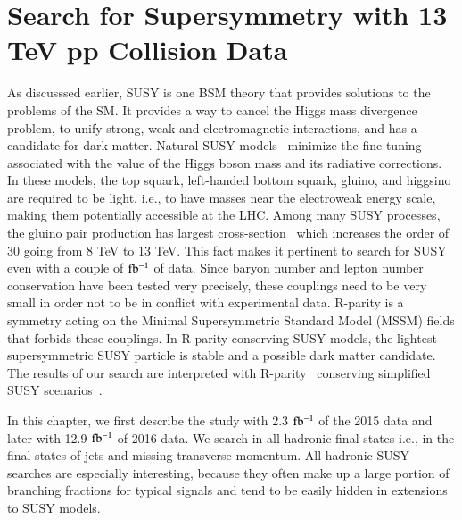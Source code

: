 




\chapter{Search for Supersymmetry with 13 TeV pp Collision Data  \label{Search for Supersymmetry with 13 TeV pp Collision Data}}

As discusssed earlier, SUSY is one BSM theory that provides solutions to the problems of the SM. It provides a way to cancel the Higgs mass divergence problem, to unify strong, weak and electromagnetic interactions, and has a candidate for dark matter. Natural SUSY models~\cite{Naturaln} minimize the fine tuning associated with the value of the Higgs boson mass and its radiative corrections. In these models, the top squark, left-handed bottom squark, gluino, and higgsino are required to be light, i.e., to have masses near the electroweak energy scale, making them potentially accessible at the LHC. Among many SUSY processes, the gluino pair production has largest cross-section~\cite{xsecGlu} which increases the order of 30 going from 8 TeV to 13 TeV. This fact makes it pertinent to search for SUSY even with a couple of $\rm fb^{-1}$ of data. Since baryon number and lepton number conservation have been tested very precisely, these couplings need to be very small in order not to be in conflict with experimental data. R-parity is a symmetry acting on the Minimal Supersymmetric Standard Model (MSSM) fields that forbids these couplings. In R-parity conserving SUSY models, the lightest supersymmetric SUSY particle is stable and a possible dark matter candidate. The results of our search are interpreted with R-parity~\cite{RParity} conserving simplified SUSY scenarios~\cite{SMS1}.

In this chapter, we first describe the study with 2.3 $\rm fb^{-1}$ of the 2015 data and later with 12.9 $\rm fb^{-1}$ of 2016 data. We search in all hadronic final states i.e., in the final states of jets and missing transverse momentum. All hadronic SUSY searches are especially interesting, because they often make up a large portion of branching fractions for typical signals and tend to be easily hidden in extensions to  SUSY models.

